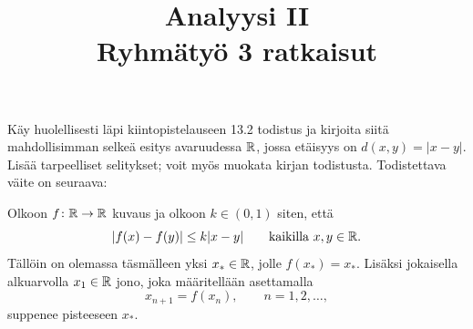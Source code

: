 \documentclass[11pt,a4paper]{amsart}
\title{Analyysi II\\Ryhmätyö 3 ratkaisut}
\author{}
\date{}
\begin{document}

\begin{exercise}
  Käy huolellisesti läpi kiintopistelauseen 13.2 todistus ja kirjoita
  siitä mahdollisimman selkeä esitys avaruudessa \(\mathbb{R}\), jossa etäisyys
  on \(d(x,y)=\lvert x-y\rvert\). Lisää tarpeelliset selitykset;
  voit myös muokata kirjan todistusta. Todistettava väite on seuraava:

  Olkoon \(f\colon\mathbb{R}\to\mathbb{R}\) kuvaus ja olkoon \(k\in(0,1)\) siten, että
  \[
    \lvert f(x)-f(y)\rvert\leq k\lvert x-y\rvert
    \qquad\text{kaikilla }x,y\in\mathbb{R}.
  \]
  Tällöin on olemassa täsmälleen yksi \(x_*\in\mathbb{R}\), jolle
  \(f(x_*)=x_*\). Lisäksi jokaisella alkuarvolla \(x_1\in\mathbb{R}\) jono,
  joka määritellään asettamalla
  \[
    x_{n+1}=f(x_n),\qquad n=1,2,\ldots,
  \]
  suppenee pisteeseen \(x_*\).
\end{exercise}
\end{document}
